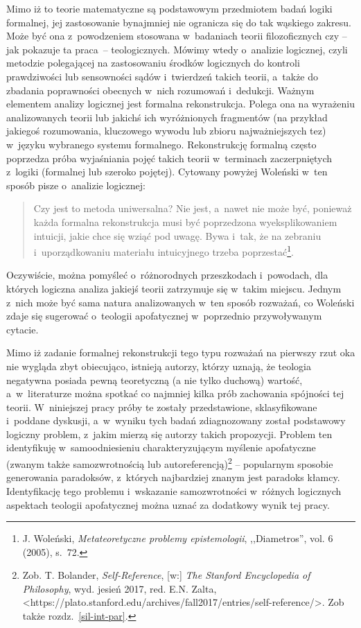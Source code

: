 Mimo iż to teorie matematyczne są podstawowym przedmiotem badań logiki formalnej, jej zastosowanie bynajmniej nie ogranicza się do tak wąskiego zakresu. Może być ona z~powodzeniem stosowana w~badaniach teorii filozoficznych czy -- jak pokazuje ta praca~-- teologicznych. Mówimy wtedy o~analizie logicznej, czyli metodzie polegającej na zastosowaniu środków logicznych do kontroli prawdziwości lub sensowności sądów i~twierdzeń takich teorii, a~także do zbadania poprawności obecnych w~nich rozumowań i~dedukcji. Ważnym elementem analizy logicznej jest formalna rekonstrukcja. Polega ona na wyrażeniu analizowanych teorii lub jakichś ich wyróżnionych fragmentów (na przykład jakiegoś rozumowania, kluczowego wywodu lub zbioru najważniejszych tez) w~języku wybranego systemu formalnego. Rekonstrukcję formalną często poprzedza próba wyjaśniania pojęć takich teorii w~terminach zaczerpniętych z~logiki (formalnej lub szeroko pojętej). Cytowany powyżej Woleński w~ten sposób pisze o~analizie logicznej:

\begin{quote}
Czy jest to metoda uniwersalna? Nie jest, a~nawet nie może być, ponieważ każda formalna rekonstrukcja musi być poprzedzona wyeksplikowaniem intuicji, jakie chce się wziąć pod uwagę. Bywa i~tak, że na zebraniu i~uporządkowaniu materiału intui\-cyjnego trzeba poprzestać\footnote{J. Woleński, \textit{Metateoretyczne problemy epistemologii}, ,,Diametros'', vol. 6 (2005), s.~72.}.
\end{quote}
Oczywiście, można pomyśleć o~różnorodnych przeszkodach i~powodach, dla których logiczna analiza jakiejś teorii zatrzymuje się w~takim miejscu. Jednym z~nich może być sama natura analizowanych w~ten sposób rozważań, co Woleński zdaje się sugerować o~teologii apofatycznej w~poprzednio przywoływanym cytacie.

Mimo iż zadanie formalnej rekonstrukcji tego typu rozważań na pierwszy rzut oka nie wygląda zbyt obiecująco, istnieją autorzy, którzy uznają, że teologia negatywna posiada pewną teoretyczną (a nie tylko duchową) wartość, a~w~literaturze można spotkać co najmniej kilka prób zachowania spójności tej teorii. W~niniejszej pracy próby te zostały przedstawione, sklasyfikowane i~poddane dyskusji, a~w~wyniku tych badań zdiagnozowany został podstawowy logiczny problem, z~jakim mierzą się autorzy takich propozycji. Problem ten identyfikuję w~samoodniesieniu charakteryzującym myślenie apofatyczne (zwanym także samozwrotnością lub autoreferencją)\footnote{Zob. T. Bolander, \textit{Self-Reference}, [w:] \textit{The Stanford Encyclopedia of Philosophy}, wyd. jesień 2017, red. E.N. Zalta, {\textless}https://plato.stanford.edu/archives/fall2017/entries/self-reference/{\textgreater}. Zob także rozdz.~\ref{sil-int-par}.} -- popularnym sposobie generowania paradoksów, z~których najbardziej znanym jest paradoks kłamcy. Identyfikację tego problemu i~wskazanie samozwrotności w~różnych logicznych aspektach teologii apofatycznej można uznać za dodatkowy wynik tej pracy.

